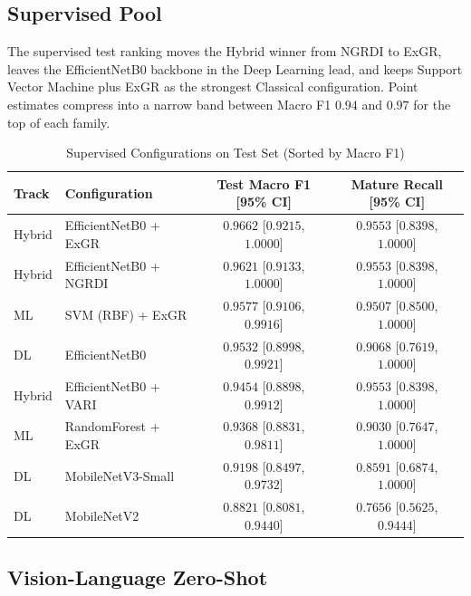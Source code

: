 \subsection{Supervised Pool}

The supervised test ranking moves the Hybrid winner from NGRDI to ExGR, leaves the EfficientNetB0 backbone in the Deep Learning lead, and keeps Support Vector Machine plus ExGR as the strongest Classical configuration. Point estimates compress into a narrow band between Macro F1 $0.94$ and $0.97$ for the top of each family.

\begin{table}[H]
    \centering
    \caption{Supervised Configurations on Test Set (Sorted by Macro F1)}
    \label{tab:test-top}
    \footnotesize
    \setlength{\tabcolsep}{4pt}
    \renewcommand{\arraystretch}{1.15}
    \begin{tabular}{@{}llcc@{}}
        \hline
        Track & Configuration & Test Macro F1 [95\% CI] & Mature Recall [95\% CI] \\
        \hline
        Hybrid & EfficientNetB0 + ExGR  & $0.9662$ [$0.9215$, $1.0000$] & $0.9553$ [$0.8398$, $1.0000$] \\
        Hybrid & EfficientNetB0 + NGRDI & $0.9621$ [$0.9133$, $1.0000$] & $0.9553$ [$0.8398$, $1.0000$] \\
        ML     & SVM (RBF) + ExGR       & $0.9577$ [$0.9106$, $0.9916$] & $0.9507$ [$0.8500$, $1.0000$] \\
        DL     & EfficientNetB0         & $0.9532$ [$0.8998$, $0.9921$] & $0.9068$ [$0.7619$, $1.0000$] \\
        Hybrid & EfficientNetB0 + VARI  & $0.9454$ [$0.8898$, $0.9912$] & $0.9553$ [$0.8398$, $1.0000$] \\
        ML     & RandomForest + ExGR    & $0.9368$ [$0.8831$, $0.9811$] & $0.9030$ [$0.7647$, $1.0000$] \\
        DL     & MobileNetV3-Small      & $0.9198$ [$0.8497$, $0.9732$] & $0.8591$ [$0.6874$, $1.0000$] \\
        DL     & MobileNetV2            & $0.8821$ [$0.8081$, $0.9440$] & $0.7656$ [$0.5625$, $0.9444$] \\
        \hline
    \end{tabular}
\end{table}


\subsection{Vision-Language Zero-Shot}

